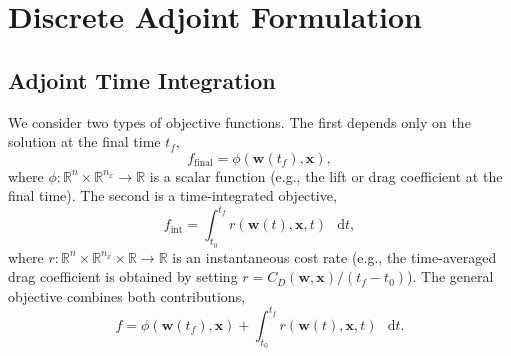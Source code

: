 \documentclass[journal]{new-aiaa}
\newcommand{\mb}[1]{\mathbf{#1}}
\renewcommand{\d}{\mathop{}\!\mathrm{d}} %
\begin{document}
\section{Discrete Adjoint Formulation}\label{sec:adjoint}

\subsection{Adjoint Time Integration}\label{sec:adjoint_time}
We consider two types of objective functions.
The first depends only on the solution at the final time $t_f$,
\begin{equation}\label{eq:objective_final}
f_{\text{final}} = \phi(\mb{w}(t_f), \mb{x}),
\end{equation}
where $\phi: \mathbb{R}^n \times \mathbb{R}^{n_x} \to \mathbb{R}$ is a scalar function (e.g., the lift or drag coefficient at the final time).
The second is a time-integrated objective,
\begin{equation}\label{eq:objective_integral}
f_{\text{int}} = \int_{t_0}^{t_f} r(\mb{w}(t), \mb{x}, t) \, \d t,
\end{equation}
where $r: \mathbb{R}^n \times \mathbb{R}^{n_x} \times \mathbb{R} \to \mathbb{R}$ is an instantaneous cost rate (e.g., the time-averaged drag coefficient is obtained by setting $r = C_D(\mb{w}, \mb{x}) / (t_f - t_0)$).
The general objective combines both contributions,
\begin{equation}\label{eq:objective_general}
f = \phi(\mb{w}(t_f), \mb{x}) + \int_{t_0}^{t_f} r(\mb{w}(t), \mb{x}, t) \, \d t.
\end{equation}
\end{document}
